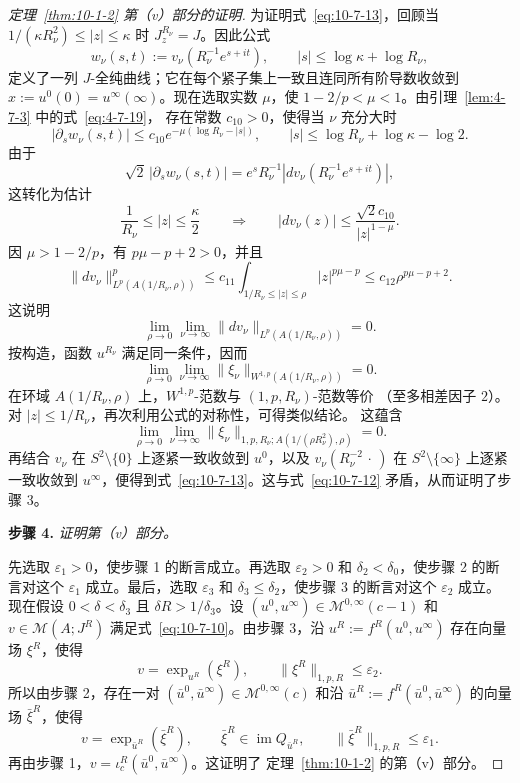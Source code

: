 \begin{proof}[定理~\ref{thm:10-1-2} 第（v）部分的证明]
为证明式~\eqref{eq:10-7-13}，回顾当
$1/(\kappa R_\nu^2)\leq|z|\leq\kappa$ 时 $J_z^{R_\nu}=J$。因此公式
\[
  w_\nu(s,t):=v_\nu(R_\nu^{-1}e^{s+it}),
  \qquad |s|\leq\log\kappa+\log R_\nu,
\]
定义了一列 $J$-全纯曲线；它在每个紧子集上一致且连同所有阶导数收敛到
$x:=u^0(0)=u^\infty(\infty)$。现在选取实数 $\mu$，使
$1-2/p<\mu<1$。由引理~\ref{lem:4-7-3} 中的式~\eqref{eq:4-7-19}，
存在常数 $c_{10}>0$，使得当 $\nu$ 充分大时
\[
  |\partial_sw_\nu(s,t)|
  \leq c_{10}e^{-\mu(\log R_\nu-|s|)},
  \qquad |s|\leq\log R_\nu+\log\kappa-\log2.
\]
由于
\[
  \sqrt2\,|\partial_sw_\nu(s,t)|
  =e^sR_\nu^{-1}|dv_\nu(R_\nu^{-1}e^{s+it})|,
\]
这转化为估计
\[
  \frac1{R_\nu}\leq|z|\leq\frac\kappa2
  \qquad\Longrightarrow\qquad
  |dv_\nu(z)|\leq\frac{\sqrt2c_{10}}{|z|^{1-\mu}}.
\]
因 $\mu>1-2/p$，有 $p\mu-p+2>0$，并且
\[
  \lVert dv_\nu\rVert_{L^p(A(1/R_\nu,\rho))}^p
  \leq c_{11}\int_{1/R_\nu\leq|z|\leq\rho}|z|^{p\mu-p}
  \leq c_{12}\rho^{p\mu-p+2}.
\]
这说明
\[
  \lim_{\rho\to0}\lim_{\nu\to\infty}
  \lVert dv_\nu\rVert_{L^p(A(1/R_\nu,\rho))}=0.
\]
按构造，函数 $u^{R_\nu}$ 满足同一条件，因而
\[
  \lim_{\rho\to0}\lim_{\nu\to\infty}
  \lVert\xi_\nu\rVert_{W^{1,p}(A(1/R_\nu,\rho))}=0.
\]
在环域 $A(1/R_\nu,\rho)$ 上，$W^{1,p}$-范数与 $(1,p,R_\nu)$-范数等价
（至多相差因子 $2$）。对 $|z|\leq1/R_\nu$，再次利用公式的对称性，可得类似结论。
这蕴含
\[
  \lim_{\rho\to0}\lim_{\nu\to\infty}
  \lVert\xi_\nu\rVert_{1,p,R_\nu;A(1/(\rho R_\nu^2),\rho)}=0.
\]
再结合 $v_\nu$ 在 $S^2\setminus\{0\}$ 上逐紧一致收敛到 $u^0$，以及
$v_\nu(R_\nu^{-2}\,\cdot\,)$ 在 $S^2\setminus\{\infty\}$ 上逐紧一致收敛到
$u^\infty$，便得到式~\eqref{eq:10-7-13}。这与式~\eqref{eq:10-7-12}
矛盾，从而证明了步骤 3。

\medskip
\noindent\textbf{步骤 4.}
\emph{证明第（v）部分。}

先选取 $\varepsilon_1>0$，使步骤 1 的断言成立。再选取 $\varepsilon_2>0$ 和
$\delta_2<\delta_0$，使步骤 2 的断言对这个 $\varepsilon_1$ 成立。最后，选取
$\varepsilon_3$ 和 $\delta_3\leq\delta_2$，使步骤 3 的断言对这个
$\varepsilon_2$ 成立。现在假设 $0<\delta<\delta_3$ 且
$\delta R>1/\delta_3$。设 $(u^0,u^\infty)\in\mathcal M^{0,\infty}(c-1)$ 和
$v\in\mathcal M(A;J^R)$ 满足式~\eqref{eq:10-7-10}。由步骤 3，沿
$u^R:=f^R(u^0,u^\infty)$ 存在向量场 $\xi^R$，使得
\[
  v=\exp_{u^R}(\xi^R),\qquad
  \lVert\xi^R\rVert_{1,p,R}\leq\varepsilon_2.
\]
所以由步骤 2，存在一对
$(\bar u^0,\bar u^\infty)\in\mathcal M^{0,\infty}(c)$ 和沿
$\bar u^R:=f^R(\bar u^0,\bar u^\infty)$ 的向量场 $\bar\xi^R$，使得
\[
  v=\exp_{\bar u^R}(\bar\xi^R),\qquad
  \bar\xi^R\in\operatorname{im}Q_{\bar u^R},\qquad
  \lVert\bar\xi^R\rVert_{1,p,R}\leq\varepsilon_1.
\]
再由步骤 1，$v=\iota_c^R(\bar u^0,\bar u^\infty)$。这证明了
定理~\ref{thm:10-1-2} 的第（v）部分。
\end{proof}
